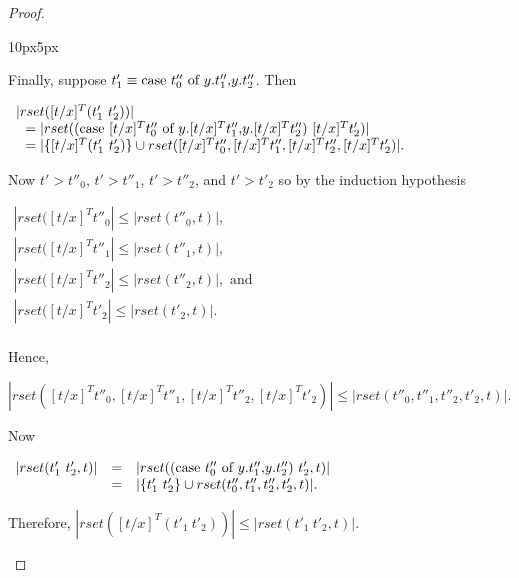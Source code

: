 \begin{proof}
\begin{changemargin}{10px}{5px}
\begin{itemize}
  Finally, suppose $t'_1 \equiv \mbox{case}\ t''_0\ \text{of}\ y\text{.}t''_1\text{,}y\text{.}t''_2$.  Then
  \begin{center}
    \begin{math}
      \begin{array}{lll}
        |rset([t/x]^T (t'_1\ t'_2))| \\
        \,\,\,\,= |rset((\mbox{case}\ [t/x]^T t''_0\ \text{of}\ y\text{.}[t/x]^T t''_1\text{,}y\text{.}[t/x]^T t''_2)\ [t/x]^T t'_2)|\\
        \,\,\,\,= |\{[t/x]^T (t'_1\ t'_2)\} \cup rset([t/x]^T t''_0,[t/x]^T t''_1,[t/x]^T t''_2,[t/x]^T t'_2)|.
      \end{array}
    \end{math}
  \end{center}
  Now $t' > t''_0$, $t' > t''_1$, $t' > t''_2$, and $t' > t'_2$ so by the induction hypothesis
  \begin{center}
    \begin{math}
      \begin{array}{lll}
        |rset([t/x]^T t''_0| \leq |rset(t''_0, t)|,\\
        |rset([t/x]^T t''_1| \leq |rset(t''_1, t)|,\\
        |rset([t/x]^T t''_2| \leq |rset(t''_2, t)|, \text{ and }\\
        |rset([t/x]^T t'_2| \leq |rset(t'_2, t)|.\\
      \end{array}
    \end{math}
  \end{center}
  Hence, 
  \begin{center}
    \begin{math}
      |rset([t/x]^T t''_0,[t/x]^T t''_1,[t/x]^T t''_2,[t/x]^T t'_2)| \leq |rset(t''_0, t''_1, t''_2, t'_2, t)|.
    \end{math}
  \end{center}
  Now
  \begin{center}
    \begin{math}
      \begin{array}{lll}
        |rset(t'_1\ t'_2,t)| & = & |rset((\mbox{case}\ t''_0\ \text{of}\ y\text{.}t''_1\text{,}y\text{.}t''_2)\ t'_2,t)|\\
        & = & |\{t'_1\ t'_2\} \cup rset(t''_0, t''_1, t''_2, t'_2, t)|.
      \end{array}
    \end{math}
  \end{center}
  Therefore, $|rset([t/x]^T (t'_1\ t'_2))| \leq |rset(t'_1\ t'_2,t)|$.
  

\end{itemize}
\end{changemargin}
\end{proof}

